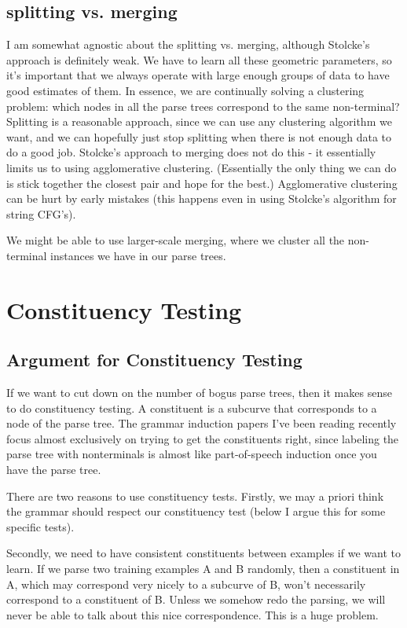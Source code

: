 \documentclass{article}
\begin{document}
\subsection{splitting vs. merging}
I am somewhat agnostic about the splitting vs. merging, although
Stolcke's approach is definitely weak. We have to learn all these
geometric parameters, so it's important that we always operate with
large enough groups of data to have good estimates of them. In essence,
we are continually solving a clustering problem: which nodes in all the
parse trees correspond to the same non-terminal? Splitting is a
reasonable approach, since we can use any clustering algorithm we want,
and we can hopefully just stop splitting when there is not enough data
to do a good job. Stolcke's approach to merging does not do this - it
essentially limits us to using agglomerative clustering. (Essentially
the only thing we can do is stick together the closest pair and hope for
the best.) Agglomerative clustering can be hurt by early mistakes (this
happens even in using Stolcke's algorithm for string CFG's).

We might be able to use larger-scale merging, where we cluster all the
non-terminal instances we have in our parse trees.

\section{Constituency Testing}

\subsection{Argument for Constituency Testing}
If we want to cut down on the number of bogus parse trees, then it
makes sense to do constituency testing. A constituent is a subcurve that
corresponds to a node of the parse tree. The grammar induction papers
I've been reading recently focus almost exclusively on trying to get the
constituents right, since labeling the parse tree with nonterminals is
almost like part-of-speech induction once you have the parse tree.

There are two reasons to use constituency tests. Firstly, we may a
priori think the grammar should respect our constituency test (below I
argue this for some specific tests).

Secondly, we need to have consistent constituents between examples if we
want to learn. If we parse two training examples A and B randomly, then
a constituent in A, which may correspond very nicely to a subcurve of B,
won't necessarily correspond to a constituent of B. Unless we somehow
redo the parsing, we will never be able to talk about this nice
correspondence. This is a huge problem.
\end{document}
